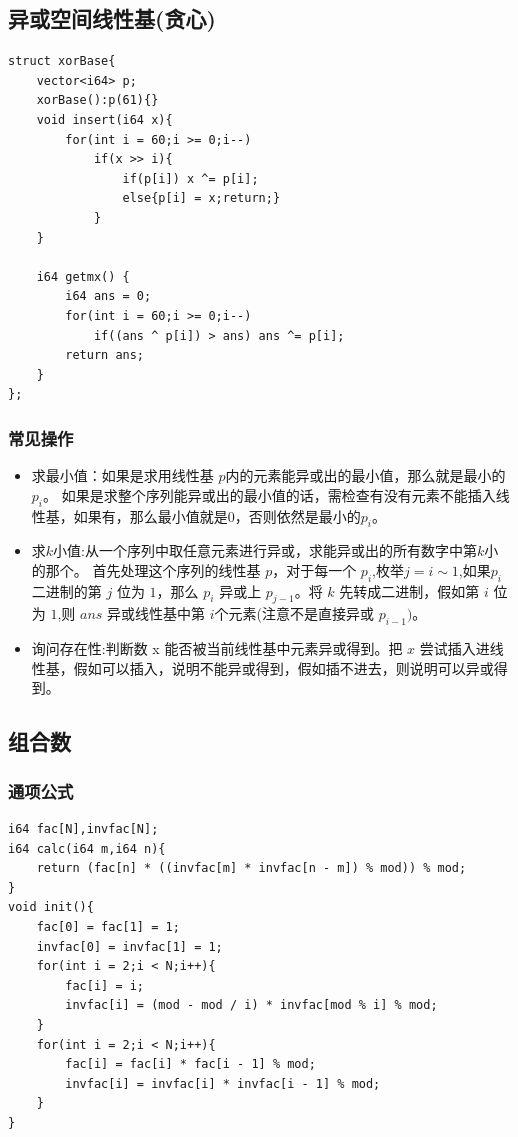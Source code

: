\subsection{异或空间线性基(贪心)}
\begin{lstlisting}[caption={}]
struct xorBase{
    vector<i64> p;
    xorBase():p(61){}
    void insert(i64 x){
        for(int i = 60;i >= 0;i--)
            if(x >> i){
                if(p[i]) x ^= p[i];
                else{p[i] = x;return;}
            }
    }

    i64 getmx() {
        i64 ans = 0;
        for(int i = 60;i >= 0;i--)
            if((ans ^ p[i]) > ans) ans ^= p[i];
        return ans;
    }
};
\end{lstlisting}
\subsubsection{常见操作}
\begin{itemize}
    \item 求最小值：如果是求用线性基 $p$内的元素能异或出的最小值，那么就是最小的$p_i$。
                如果是求整个序列能异或出的最小值的话，需检查有没有元素不能插入线性基，如果有，那么最小值就是$0$，否则依然是最小的$p_i$​。
    \item 求$k$小值:从一个序列中取任意元素进行异或，求能异或出的所有数字中第$k$小的那个。
                首先处理这个序列的线性基 $p$，对于每一个 $p_i$,枚举$j=i\sim 1$,如果$p_i$ 二进制的第 $j$ 位为 $1$，那么 $p_i$ 异或上 
                $p_{j-1}$。将 $k$ 先转成二进制，假如第 $i$  位为 $1$,则 $ans$ 异或线性基中第 $i$个元素(注意不是直接异或 $p_{i-1})$。
    \item 询问存在性:判断数 x 能否被当前线性基中元素异或得到。把 $x$ 尝试插入进线性基，假如可以插入，说明不能异或得到，假如插不进去，则说明可以异或得到。
\end{itemize}




\subsection{组合数}
\subsubsection{通项公式}
\begin{lstlisting}[caption={}]
i64 fac[N],invfac[N];
i64 calc(i64 m,i64 n){
    return (fac[n] * ((invfac[m] * invfac[n - m]) % mod)) % mod;
}
void init(){
    fac[0] = fac[1] = 1;
    invfac[0] = invfac[1] = 1;
	for(int i = 2;i < N;i++){
		fac[i] = i;
		invfac[i] = (mod - mod / i) * invfac[mod % i] % mod;
	}
    for(int i = 2;i < N;i++){
		fac[i] = fac[i] * fac[i - 1] % mod;
		invfac[i] = invfac[i] * invfac[i - 1] % mod;
    }
}
\end{lstlisting}

